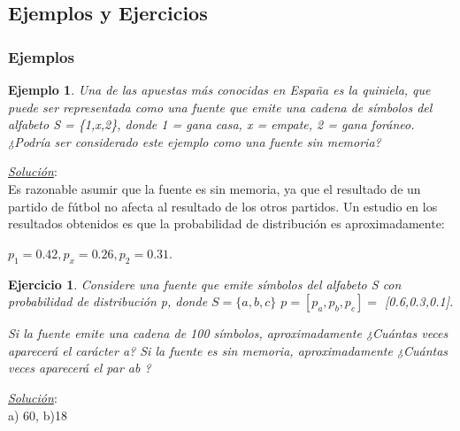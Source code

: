 \documentclass{beamer}
\newtheorem{ejemplo} [Ejemplo] {Ejemplo}
\newtheorem{ejercicio} [Corolario]{Ejercicio}
\begin{document}

\subsection{Ejemplos y Ejercicios}

\begin{frame}  \frametitle{Ejemplos}    \small
 
 \begin{ejemplo}
Una de las apuestas más conocidas en España es la quiniela, que puede ser representada como una fuente que emite una cadena de símbolos del alfabeto S = \{1,x,2\}, donde 1 = gana casa, x = empate, 2 = gana foráneo. ¿Podría ser considerado este ejemplo como una fuente sin memoria?
\end{ejemplo}

\pause
\textit{\underline{Solución}}:\\
 Es razonable asumir que la fuente es sin memoria, ya que el resultado de un partido de fútbol no afecta al resultado de los otros partidos. Un estudio en los resultados obtenidos es que la probabilidad de distribución es aproximadamente:

\begin{center}
$p_1 = 0.42,	p_x = 0.26,	p_2 = 0.31.$
\end{center}


\end{frame}



\begin{frame}  \small

\begin{ejercicio} Considere una fuente que emite símbolos del alfabeto S con probabilidad de distribución p, donde 
$S = \{a,b,c\}$	  $p = [p_a,p_b,p_c] =$ [0.6,0.3,0.1].

Si la fuente emite una cadena de 100 símbolos, aproximadamente ¿Cuántas veces aparecerá el carácter a?  Si la fuente es sin memoria, aproximadamente ¿Cuántas veces aparecerá el par ab ?
\end{ejercicio}
\pause
\textit{\underline{Solución}}:\\
a) 60, b)18




\end{frame} 

\end{document}
